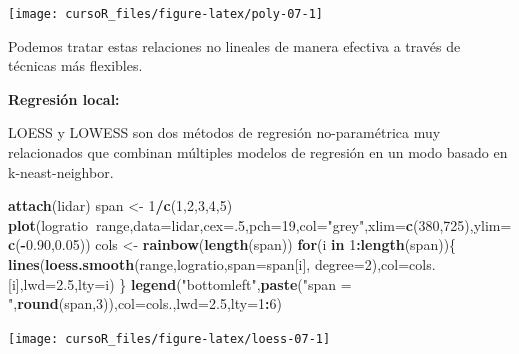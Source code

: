\documentclass[]{book}
\newenvironment{Shaded}{\begin{snugshade}}{\end{snugshade}}
\newcommand{\KeywordTok}[1]{\textcolor[rgb]{0.13,0.29,0.53}{\textbf{#1}}}
\newcommand{\DataTypeTok}[1]{\textcolor[rgb]{0.13,0.29,0.53}{#1}}
\newcommand{\DecValTok}[1]{\textcolor[rgb]{0.00,0.00,0.81}{#1}}
\newcommand{\FloatTok}[1]{\textcolor[rgb]{0.00,0.00,0.81}{#1}}
\newcommand{\StringTok}[1]{\textcolor[rgb]{0.31,0.60,0.02}{#1}}
\newcommand{\ControlFlowTok}[1]{\textcolor[rgb]{0.13,0.29,0.53}{\textbf{#1}}}
\newcommand{\OperatorTok}[1]{\textcolor[rgb]{0.81,0.36,0.00}{\textbf{#1}}}
\newcommand{\NormalTok}[1]{#1}
\begin{document}
\begin{center}\texttt{[image: cursoR\_files/figure-latex/poly-07-1]} \end{center}

Podemos tratar estas relaciones no lineales de manera efectiva a través
de técnicas más flexibles.

\textbf{Regresión local:}

LOESS y LOWESS son dos métodos de regresión no-paramétrica muy
relacionados que combinan múltiples modelos de regresión en un modo
basado en k-neast-neighbor.

\begin{Shaded}
\begin{Highlighting}[]
\KeywordTok{attach}\NormalTok{(lidar)}
\NormalTok{span <-}\StringTok{ }\DecValTok{1}\OperatorTok{/}\KeywordTok{c}\NormalTok{(}\DecValTok{1}\NormalTok{,}\DecValTok{2}\NormalTok{,}\DecValTok{3}\NormalTok{,}\DecValTok{4}\NormalTok{,}\DecValTok{5}\NormalTok{)}
\KeywordTok{plot}\NormalTok{(logratio}\OperatorTok{~}\NormalTok{range,}\DataTypeTok{data=}\NormalTok{lidar,}\DataTypeTok{cex=}\NormalTok{.}\DecValTok{5}\NormalTok{,}\DataTypeTok{pch=}\DecValTok{19}\NormalTok{,}\DataTypeTok{col=}\StringTok{"grey"}\NormalTok{,}\DataTypeTok{xlim=}\KeywordTok{c}\NormalTok{(}\DecValTok{380}\NormalTok{,}\DecValTok{725}\NormalTok{),}\DataTypeTok{ylim=}\KeywordTok{c}\NormalTok{(}\OperatorTok{-}\FloatTok{0.90}\NormalTok{,}\FloatTok{0.05}\NormalTok{))}
\NormalTok{cols <-}\StringTok{ }\KeywordTok{rainbow}\NormalTok{(}\KeywordTok{length}\NormalTok{(span))}
\ControlFlowTok{for}\NormalTok{(i }\ControlFlowTok{in} \DecValTok{1}\OperatorTok{:}\KeywordTok{length}\NormalTok{(span))\{}
  \KeywordTok{lines}\NormalTok{(}\KeywordTok{loess.smooth}\NormalTok{(range,logratio,}\DataTypeTok{span=}\NormalTok{span[i], }\DataTypeTok{degree=}\DecValTok{2}\NormalTok{),}\DataTypeTok{col=}\NormalTok{cols.[i],}\DataTypeTok{lwd=}\FloatTok{2.5}\NormalTok{,}\DataTypeTok{lty=}\NormalTok{i)}
\NormalTok{\}}
\KeywordTok{legend}\NormalTok{(}\StringTok{"bottomleft"}\NormalTok{,}\KeywordTok{paste}\NormalTok{(}\StringTok{"span = "}\NormalTok{,}\KeywordTok{round}\NormalTok{(span,}\DecValTok{3}\NormalTok{)),}\DataTypeTok{col=}\NormalTok{cols.,}\DataTypeTok{lwd=}\FloatTok{2.5}\NormalTok{,}\DataTypeTok{lty=}\DecValTok{1}\OperatorTok{:}\DecValTok{6}\NormalTok{)}
\end{Highlighting}
\end{Shaded}

\begin{center}\texttt{[image: cursoR\_files/figure-latex/loess-07-1]} \end{center}
\end{document}
